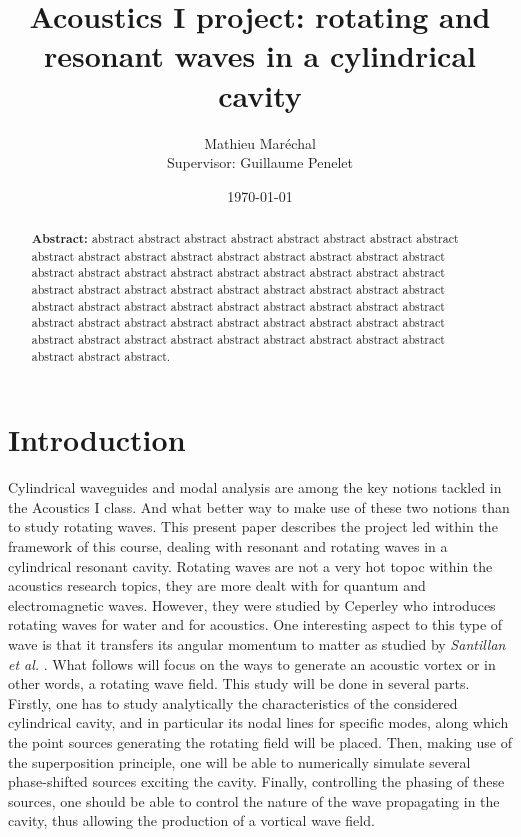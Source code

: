 \documentclass[%
 reprint,
 amsmath,amssymb,
 aip,
]{revtex4-1}
\begin{document}
\title{Acoustics I project: rotating and resonant waves in a cylindrical cavity}
\author{Mathieu Maréchal\\ Supervisor: Guillaume Penelet}
%
\date{\today}

\begin{abstract}
    \textbf{Abstract:} abstract abstract abstract abstract abstract abstract abstract abstract abstract abstract abstract abstract abstract abstract abstract abstract abstract abstract abstract abstract abstract abstract abstract abstract abstract abstract abstract abstract abstract abstract abstract abstract abstract abstract abstract abstract abstract abstract abstract abstract abstract abstract abstract abstract abstract abstract abstract abstract abstract abstract abstract abstract abstract abstract abstract abstract abstract abstract abstract abstract abstract abstract abstract abstract abstract.
\end{abstract}

\maketitle
\section{Introduction}
Cylindrical waveguides and modal analysis are among the key notions tackled in the Acoustics I class. And what better way to make use of these two notions than to study rotating waves. This present paper describes the project led within the framework of this course, dealing with resonant and rotating waves in a cylindrical resonant cavity. Rotating waves are not a very hot topoc within the acoustics research topics, they are more dealt with for quantum and electromagnetic waves. However, they were studied by Ceperley \cite{ceperley2002} who introduces rotating waves for water and for acoustics. One interesting aspect to this type of wave is that it transfers its angular momentum to matter as studied by \emph{Santillan et al.} \cite{santillan2009}. What follows will focus on the ways to generate an acoustic vortex or in other words, a rotating wave field. This study will be done in several parts. Firstly, one has to study analytically the characteristics of the considered cylindrical cavity, and in particular its nodal lines for specific modes, along which the point sources generating the rotating field will be placed. Then, making use of the superposition principle, one will be able to numerically simulate several phase-shifted sources exciting the cavity. Finally, controlling the phasing of these sources, one should be able to control the nature of the wave propagating in the cavity, thus allowing the production of a vortical wave field. 
\end{document}
